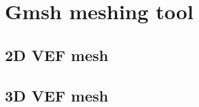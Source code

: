 \documentclass[english]{article}
\begin{document}
\section{Gmsh meshing tool}
\subsection{2D VEF mesh}

\subsection{3D VEF mesh}



%
%
%


\end{document}
